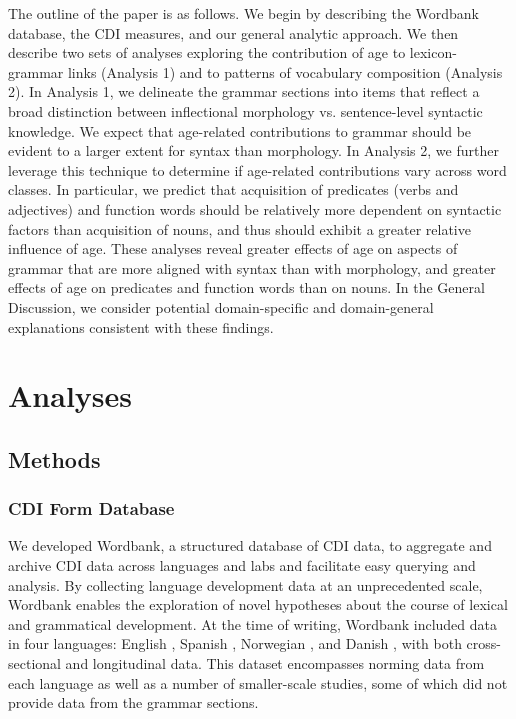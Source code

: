 \documentclass[10pt,letterpaper]{article}
\begin{document}
The outline of the paper is as follows. We begin by describing the Wordbank database, the CDI measures, and our general analytic approach. We then describe two sets of analyses exploring the contribution of age to lexicon-grammar links (Analysis 1) and to patterns of vocabulary composition (Analysis 2). In Analysis 1, we delineate the grammar sections into items that reflect a broad distinction between inflectional morphology vs. sentence-level syntactic knowledge. We expect that age-related contributions to grammar should be evident to a larger extent for syntax than morphology.  In Analysis 2, we further leverage this technique to determine if age-related contributions vary across word classes. In particular, we predict that acquisition of predicates (verbs and adjectives) and function words should be relatively more dependent on syntactic factors than acquisition of nouns, and thus should exhibit a greater relative influence of age. These analyses reveal greater effects of age on aspects of grammar that are more aligned with syntax than with morphology, and greater effects of age on predicates and function words than on nouns. In the General Discussion, we consider potential domain-specific and domain-general explanations consistent with these findings.

\section{Analyses}

\subsection{Methods}

\subsubsection{CDI Form Database}

We developed Wordbank, a structured database of CDI data, to aggregate and archive CDI data across languages and labs and facilitate easy querying and analysis. By collecting language development data at an unprecedented scale, Wordbank enables the exploration of novel hypotheses about the course of lexical and grammatical development. At the time of writing, Wordbank included data in four languages: English \cite{fenson2007}, Spanish \cite{jackson1993}, Norwegian \cite{simonsen2014}, and Danish \cite{bleses2008}, with both cross-sectional and longitudinal data. This dataset encompasses norming data from each language as well as a number of smaller-scale studies, some of which did not provide data from the grammar sections. %
\end{document}
